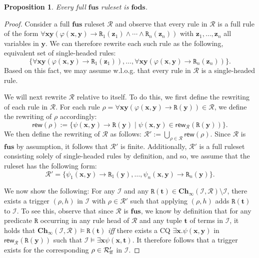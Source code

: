 \documentclass[10pt,a4paper]{amsart}
\theoremstyle{definition}
\numberwithin{equation}{section}
\theoremstyle{plain}
\newtheorem{proposition}[proposition]{Proposition}
\theoremstyle{definition}
\theoremstyle{myexample}
\theoremstyle{plain}
\theoremstyle{definition}
\renewcommand{\vec}[1]{\boldsymbol{#1}}
\newcommand{\instance}{\mathcal{I}}
\newcommand{\inst}{\instance}
\newcommand{\fcn}[1]{\mathsf{#1}}
\newcommand{\ruleset}{\calr}
\newcommand{\fus}{\mathbf{fus}}
\newcommand{\fods}{\mathbf{fods}}
\newcommand{\chase}{\mathbf{Ch}}
\newcommand{\calr}{\mathcal{R}}
\newcommand{\pred}[1]{\mathtt{#1}}
\newcommand{\rpred}{\pred{R}}
\newcommand{\iffi}{\textit{iff} } %
\renewcommand{\phi}{\varphi}
\begin{document}
\begin{proposition}
Every full $\fus$ ruleset is $\fods$.
\end{proposition}
\begin{proof}
Consider a full $\fus$ ruleset $\ruleset$ and observe that every rule in $\ruleset$ is a full rule of the form $\forall \vec{x} \vec{y}(\phi(\vec{x},\vec{y}) \rightarrow \rpred_{1}(\vec{z}_{1}) \land \cdots \land \rpred_{n}(\vec{z}_{n}))$ with $\vec{z}_{1}, \ldots, \vec{z}_{n}$ all variables in $\vec{y}$. We can therefore rewrite each such rule as the following, equivalent set of single-headed rules:
$$
\{\forall \vec{x} \vec{y}(\phi(\vec{x},\vec{y}) \rightarrow \rpred_{1}(\vec{z}_{1})), \ldots, \forall \vec{x} \vec{y}(\phi(\vec{x},\vec{y}) \rightarrow \rpred_{n}(\vec{z}_{n}))\}.
$$%
Based on this fact, we may assume w.l.o.g. that every rule in $\ruleset$ is a single-headed rule.

We will next rewrite $\ruleset$ relative to itself. To do this, we first define the rewriting of each rule in $\ruleset$. For each rule $\rho = \forall \vec{x} \vec{y}(\phi(\vec{x},\vec{y}) \rightarrow \rpred(\vec{y})) \in \ruleset$, we define the rewriting of $\rho$ accordingly:
$$
\fcn{rew}(\rho) := \{\psi(\vec{x}, \vec{y}) \rightarrow \rpred(\vec{y}) \mid  \psi(\vec{x},\vec{y}) \in \fcn{rew}_{\ruleset}(\rpred(\vec{y})) \}.
$$%
We then define the rewriting of $\ruleset$ as follows: $\ruleset' := \bigcup_{\rho \in \ruleset} \fcn{rew}(\rho)$. Since $\ruleset$ is $\fus$ by assumption, it follows that $\ruleset'$ is finite. Additionally, $\ruleset'$ is a full ruleset consisting solely of single-headed rules by definition, and so, we assume that the ruleset has the following form:
$$
\ruleset' = \{\psi_{1}(\vec{x}, \vec{y}) \rightarrow \rpred_{1}(\vec{y}), \ldots, \psi_{n}(\vec{x}, \vec{y}) \rightarrow \rpred_{n}(\vec{y})\}.
$$

We now show the following: For any $\inst$ and any $\rpred(\vec{t}) \in \chase_{\infty}(\inst,\ruleset) \setminus \inst$, there exists a trigger $(\rho,h)$ in $\inst$ with $\rho \in \ruleset'$ such that applying $(\rho,h)$ adds $\rpred(\vec{t})$ to $\inst$. To see this, observe that since $\ruleset$ is $\fus$, we know by definition that for any predicate $\rpred$ occurring in any rule head of $\ruleset$ and any tuple $\vec{t}$ of terms in $\inst$, it holds that 
$\chase_{\infty}(\inst, \ruleset) \models \rpred(\vec{t})$ \iffi 
there exists a CQ $\exists\vec{x}.\psi(\vec{x},\vec{y})$ in $\fcn{rew}_{\ruleset}(\rpred(\vec{y}))$ such that  $\inst \models \exists \vec{x} \psi(\vec{x},\vec{t})$. It therefore follows that a trigger exists for the corresponding $\rho \in \ruleset_{\smash{\mathrm{ff}}}'$ in $\inst$.


\end{proof}
\end{document}
